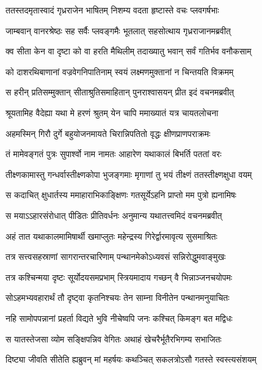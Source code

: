 
\twolineshloka
{ततस्तदमृतास्वादं गृध्रराजेन भाषितम्}
{निशम्य वदता हृष्टास्ते वचः प्लवगर्षभाः} %

\twolineshloka
{जाम्बवान् वानरश्रेष्ठः सह सर्वैः प्लवङ्गमैः}
{भूतलात् सहसोत्थाय गृध्रराजानमब्रवीत्} %

\twolineshloka
{क्व सीता केन वा दृष्टा को वा हरति मैथिलीम्}
{तदाख्यातु भवान् सर्वं गतिर्भव वनौकसाम्} %

\twolineshloka
{को दाशरथिबाणानां वज्रवेगनिपातिनाम्}
{स्वयं लक्ष्मणमुक्तानां न चिन्तयति विक्रमम्} %

\twolineshloka
{स हरीन् प्रतिसम्मुक्तान् सीताश्रुतिसमाहितान्}
{पुनराश्वासयन् प्रीत इदं वचनमब्रवीत्} %

\twolineshloka
{श्रूयतामिह वैदेह्या यथा मे हरणं श्रुतम्}
{येन चापि ममाख्यातं यत्र चायतलोचना} %

\twolineshloka
{अहमस्मिन् गिरौ दुर्गे बहुयोजनमायते}
{चिरान्निपतितो वृद्धः क्षीणप्राणपराक्रमः} %

\twolineshloka
{तं मामेवङ्गतं पुत्रः सुपार्श्वो नाम नामतः}
{आहारेण यथाकालं बिभर्ति पततां वरः} %

\twolineshloka
{तीक्ष्णकामास्तु गन्धर्वास्तीक्ष्णकोपा भुजङ्गमाः}
{मृगाणां तु भयं तीक्ष्णं ततस्तीक्ष्णक्षुधा वयम्} %

\twolineshloka
{स कदाचित् क्षुधार्तस्य ममाहाराभिकाङ्क्षिणः}
{गतसूर्येऽहनि प्राप्तो मम पुत्रो ह्यनामिषः} %

\twolineshloka
{स मयाऽऽहारसंरोधात् पीडितः प्रीतिवर्धनः}
{अनुमान्य यथातत्त्वमिदं वचनमब्रवीत्} %

\twolineshloka
{अहं तात यथाकालमामिषार्थी खमाप्लुतः}
{महेन्द्रस्य गिरेर्द्वारमावृत्य सुसमाश्रितः} %

\twolineshloka
{तत्र सत्त्वसहस्राणां सागरान्तरचारिणाम्}
{पन्थानमेकोऽध्यवसं सन्निरोद्धुमवाङ्मुखः} %

\twolineshloka
{तत्र कश्चिन्मया दृष्टः सूर्योदयसमप्रभाम्}
{स्त्रियमादाय गच्छन् वै भिन्नाञ्जनचयोपमः} %

\twolineshloka
{सोऽहमभ्यवहारार्थं तौ दृष्ट्वा कृतनिश्चयः}
{तेन साम्ना विनीतेन पन्थानमनुयाचितः} %

\twolineshloka
{नहि सामोपपन्नानां प्रहर्ता विद्यते भुवि}
{नीचेष्वपि जनः कश्चित् किमङ्ग बत मद्विधः} %

\twolineshloka
{स यातस्तेजसा व्योम सङ्क्षिपन्निव वेगितः}
{अथाहं खेचरैर्भूतैरभिगम्य सभाजितः} %

\twolineshloka
{दिष्ट्या जीवति सीतेति ह्यब्रुवन् मां महर्षयः}
{कथञ्चित् सकलत्रोऽसौ गतस्ते स्वस्त्यसंशयम्} %

